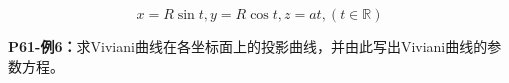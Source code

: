 \begin{center}
\end{center}

$$x=R\sin t, y=R\cos t, z=at,(t\in\mathbb{R})$$

{\bf P61-例6：}求Viviani曲线在各坐标面上的投影曲线，并由此写出Viviani曲线的参数方程。

\begin{center}
\end{center}

